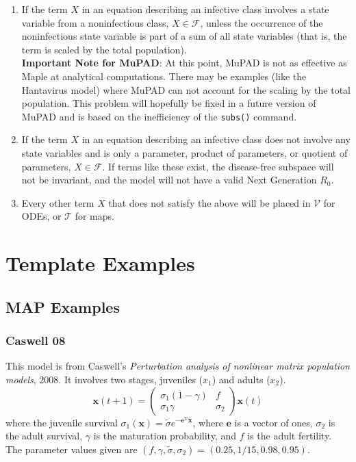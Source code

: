 \documentclass[12pt]{article}
\newcommand{\xvec}{\textbf{x}}
\begin{document}
\begin{enumerate}

\item If the term $X$ in an equation describing an infective class involves a state variable from a noninfectious class, $X \in \mathcal{F}$, unless the occurrence of the noninfectious state variable is part of a sum of all state variables (that is, the term is scaled by the total population).\\

\textbf{Important Note for MuPAD}:  At this point, MuPAD is not as effective as {\sf Maple} at analytical computations.  There may be examples (like the Hantavirus model) where MuPAD can not account for the scaling by the total population.  This problem will hopefully be fixed in a future version of MuPAD and is based on the inefficiency of the {\tt subs()} command.\\

\item If the term $X$ in an equation describing an infective class does not involve any state variables and is only a parameter, product of parameters, or quotient of parameters, $X \in \mathcal{F}$.  If terms like these exist, the disease-free subspace will not be invariant, and the model will not have a valid Next Generation $R_0$.

\item Every other term $X$ that does not satisfy the above will be placed in $\mathcal{V}$ for ODEs, or $\mathcal{T}$ for maps.

\end{enumerate}



\section{Template Examples}

\subsection{MAP Examples}

\subsubsection{Caswell 08}

This model is from Caswell's \textit{Perturbation analysis of nonlinear matrix population models}, 2008.  It involves two stages, juveniles ($x_1$) and adults ($x_2$).
%
\begin{equation*}
\xvec(t+1) = \begin{pmatrix} \sigma_1 (1-\gamma) & f \\ \sigma_1 \gamma & \sigma_2 \end{pmatrix} \xvec(t)
\end{equation*}
%
where the juvenile survival $\sigma_1(\xvec) = \tilde{\sigma} e^{-\textbf{e}^\textrm{T}\xvec}$, where $\textbf{e}$ is a vector of ones, $\sigma_2$ is the adult survival, $\gamma$ is the maturation probability, and $f$ is the adult fertility.  The parameter values given are $(f, \gamma, \tilde{\sigma}, \sigma_2) = ( 0.25, 1/15, 0.98, 0.95)$.
\end{document}
